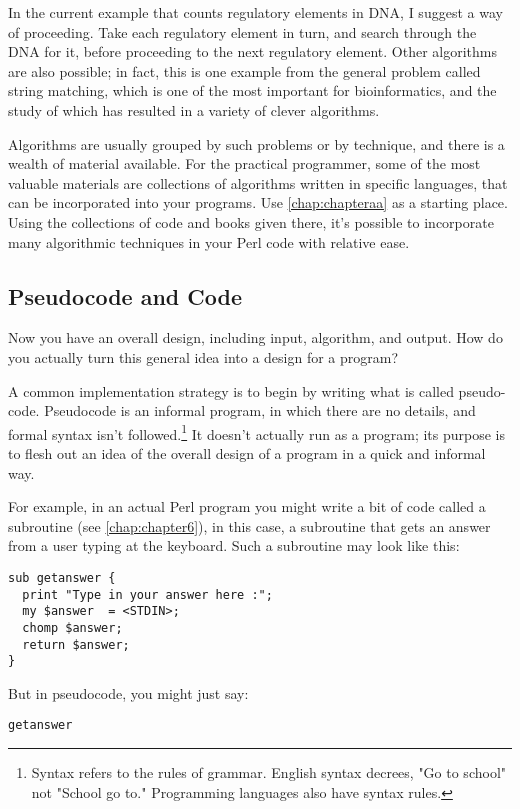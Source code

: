 In the current example that counts regulatory elements in DNA, I suggest a way of proceeding. Take each regulatory element in turn, and search through the DNA for it, before proceeding to the next regulatory element. Other algorithms are also possible; in fact, this is one example from the general problem called string matching, which is one of the most important for bioinformatics, and the study of which has resulted in a variety of clever algorithms.

Algorithms are usually grouped by such problems or by technique, and there is a wealth of material available. For the practical programmer, some of the most valuable materials are collections of algorithms written in specific languages, that can be incorporated into your programs. Use \ref{chap:chapteraa} as a starting place. Using the collections of code and books given there, it's possible to incorporate many algorithmic techniques in your Perl code with relative ease. 

\subsection{Pseudocode and Code}
Now you have an overall design, including input, algorithm, and output. How do you actually turn this general idea into a design for a program?

A common implementation strategy is to begin by writing what is called pseudo-code. Pseudocode is an informal program, in which there are no details, and formal syntax isn't followed.\footnote{Syntax refers to the rules of grammar. English syntax decrees, "Go to school" not "School go to." Programming languages also have syntax rules.} It doesn't actually run as a program; its purpose is to flesh out an idea of the overall design of a program in a quick and informal way.

For example, in an actual Perl program you might write a bit of code called a subroutine (see \ref{chap:chapter6}), in this case, a subroutine that gets an answer from a user typing at the keyboard. Such a subroutine may look like this: 

\begin{lstlisting}
sub getanswer {
  print "Type in your answer here :";
  my $answer  = <STDIN>;
  chomp $answer;
  return $answer;
}
\end{lstlisting}

But in pseudocode, you might just say:

\begin{lstlisting}
getanswer
\end{lstlisting}

